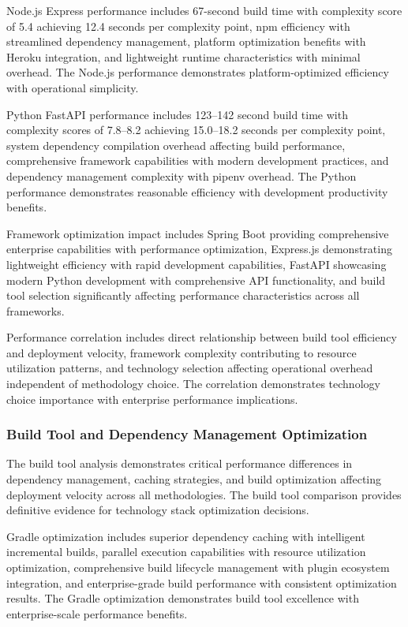 Node.js Express performance includes 67-second build time with complexity score of 5.4 achieving 12.4 seconds per complexity point, npm efficiency with streamlined dependency management, platform optimization benefits with Heroku integration, and lightweight runtime characteristics with minimal overhead. The Node.js performance demonstrates platform-optimized efficiency with operational simplicity.

Python FastAPI performance includes 123--142 second build time with complexity scores of 7.8--8.2 achieving 15.0--18.2 seconds per complexity point, system dependency compilation overhead affecting build performance, comprehensive framework capabilities with modern development practices, and dependency management complexity with pipenv overhead. The Python performance demonstrates reasonable efficiency with development productivity benefits.

Framework optimization impact includes Spring Boot providing comprehensive enterprise capabilities with performance optimization, Express.js demonstrating lightweight efficiency with rapid development capabilities, FastAPI showcasing modern Python development with comprehensive API functionality, and build tool selection significantly affecting performance characteristics across all frameworks.

Performance correlation includes direct relationship between build tool efficiency and deployment velocity, framework complexity contributing to resource utilization patterns, and technology selection affecting operational overhead independent of methodology choice. The correlation demonstrates technology choice importance with enterprise performance implications.

\subsubsection{Build Tool and Dependency Management Optimization}

The build tool analysis demonstrates critical performance differences in dependency management, caching strategies, and build optimization affecting deployment velocity across all methodologies. The build tool comparison provides definitive evidence for technology stack optimization decisions.

Gradle optimization includes superior dependency caching with intelligent incremental builds, parallel execution capabilities with resource utilization optimization, comprehensive build lifecycle management with plugin ecosystem integration, and enterprise-grade build performance with consistent optimization results. The Gradle optimization demonstrates build tool excellence with enterprise-scale performance benefits.

